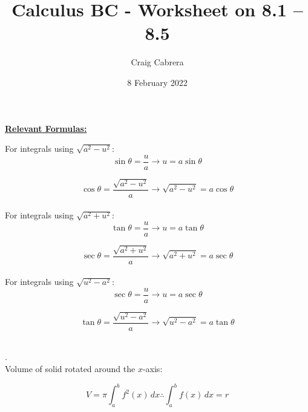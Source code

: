 \documentclass[10pt, letterpaper]{report}
\title{Calculus BC - Worksheet on 8.1 -- 8.5}
\author{Craig Cabrera}
\date{8 February 2022}
\begin{document}
\maketitle
\begin{center}
  \textbf{\underline{Relevant Formulas:}}
\end{center}

For integrals using $\sqrt{a^{2}-u^{2}}$: \\
$$\sin{\theta}=\frac{u}{a}\rightarrow u=a\sin{\theta}$$ 

$$\cos{\theta}=\frac{\sqrt{a^{2}-u^{2}}}{a}\rightarrow \sqrt{a^{2}-u^{2}}=a\cos{\theta}$$ \\

For integrals using $\sqrt{a^{2}+u^{2}}$: \\
$$\tan{\theta}=\frac{u}{a}\rightarrow u=a\tan{\theta}$$

$$\sec{\theta}=\frac{\sqrt{a^{2}+u^{2}}}{a}\rightarrow \sqrt{a^{2}+u^{2}}=a\sec{\theta}$$ \\ 

For integrals using $\sqrt{u^{2}-a^{2}}$: \\
$$\sec{\theta}=\frac{u}{a}\rightarrow u=a\sec{\theta}$$

$$\tan{\theta}=\frac{\sqrt{u^{2}-a^{2}}}{a}\rightarrow \sqrt{u^{2}-a^{2}}=a\tan{\theta}$$ \\ 

\par . \\
\noindent Volume of solid rotated around the $x$-axis: 

$$ V=\pi\int_{a}^{b}{f^{2}(x)}\,dx\therefore \int_{a}^{b}{f(x)}\,dx=r$$
\pagebreak
\end{document}
